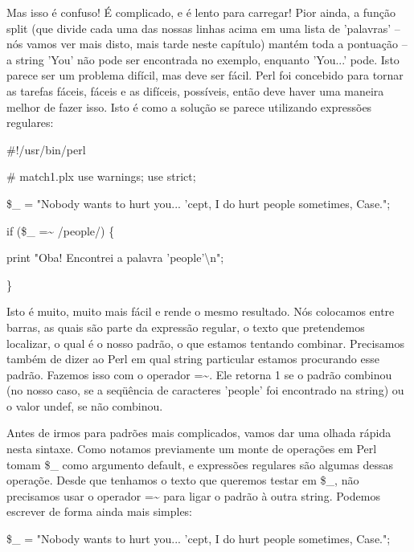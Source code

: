 \documentclass[a4paper,11pt]{book}
\begin{document}
\noindent 

\noindent Mas isso é confuso! É complicado, e é lento para carregar! Pior ainda, a função split (que divide cada uma das nossas linhas acima em uma lista de 'palavras' -- nós vamos ver mais disto, mais tarde neste capítulo) mantém toda a pontuação -- a string 'You' não pode ser encontrada no exemplo, enquanto 'You...' pode. Isto parece ser um problema difícil, mas deve ser fácil. Perl foi concebido para tornar as tarefas fáceis, fáceis e as difíceis, possíveis, então deve haver uma maneira melhor de fazer isso. Isto é como a solução se parece utilizando expressões regulares:

\noindent 

\noindent 

\noindent \#!/usr/bin/perl

\noindent \# match1.plx use warnings; use strict;

\noindent 

\noindent \$\_  = "Nobody wants to hurt you... 'cept, I do hurt people sometimes, Case.";

\noindent 

\noindent if (\$\_  =\~{} /people/) \{

\noindent print "Oba! Encontrei a palavra 'people'\textbackslash n";

\noindent \}

\noindent 

\noindent Isto é muito, muito mais fácil e rende o mesmo resultado. Nós colocamos entre barras, as quais são parte da expressão regular, o texto que pretendemos localizar, o qual é o nosso padrão, o que estamos tentando combinar. Precisamos também de dizer ao Perl em qual string particular estamos procurando esse padrão. Fazemos isso com o operador =\~{}. Ele retorna 1 se o padrão combinou (no nosso caso, se a seqüência de caracteres 'people' foi encontrado na string) ou o valor undef, se não combinou.

\noindent 

\noindent Antes de irmos para padrões mais complicados, vamos dar uma olhada rápida nesta sintaxe. Como notamos previamente um monte de operações em Perl tomam \$\_ como argumento default, e expressões regulares são algumas dessas operaçõe. Desde que tenhamos o texto que queremos testar em \$\_, não precisamos usar o operador =\~{} para ligar o padrão à outra string. Podemos escrever de forma ainda mais simples:

\noindent 

\noindent \$\_  = "Nobody wants to hurt you... 'cept, I do hurt people sometimes, Case.";
\end{document}
